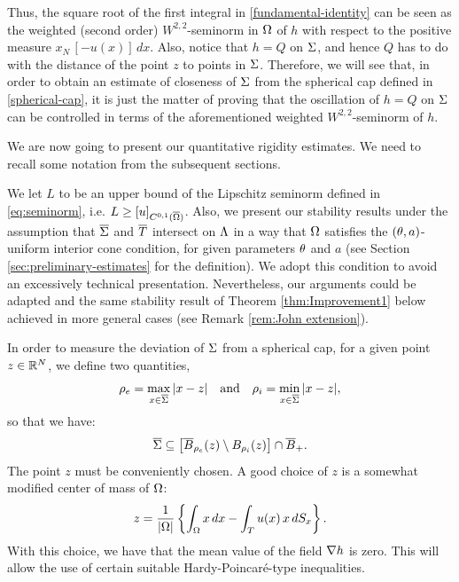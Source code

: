 \documentclass[a4paper,10pt]{amsart}
\numberwithin{equation}{section}
\begin{document}
Thus, the square root of the first integral in \eqref{fundamental-identity} can be seen as the weighted (second order) $W^{2,2}$-seminorm in $\Omega$ of $h$ with respect to the positive measure $x_N\,[-u(x)]\,dx$. Also, notice that $h=Q$ on $\Sigma$, and hence $Q$ has to do with the distance of the point $z$ to points in $\Sigma$. Therefore, we will see that, in order to obtain an estimate of closeness of $\Sigma$ from the spherical cap defined in \eqref{spherical-cap}, 
it is just the matter of proving that the oscillation of $h=Q$ on $\Sigma$ can be controlled in terms of the aforementioned weighted $W^{2,2}$-seminorm of $h$.
\par
We are now going to present our quantitative rigidity estimates. We need to recall some notation from the subsequent sections. 
\par
We let $L$ to be an upper bound of the Lipschitz seminorm defined in \eqref{eq:seminorm}, i.e. $L\ge [u]_{C^{0,1}(\overline{\Omega})}$. Also, 
we present our stability results under the assumption that $\overline{\Sigma}$ and $\overline{T}$ intersect on $\Lambda$ in a way that $\Omega$ satisfies the $(\theta,a)$-uniform interior cone condition, for given parameters $\theta$ and $a$ (see Section \ref{sec:preliminary-estimates} for the definition).
We adopt this condition to avoid an excessively technical presentation.
Nevertheless, our arguments could be adapted and the same stability result of Theorem \ref{thm:Improvement1} below achieved in
more general cases (see Remark \ref{rem:John extension}).
\par
In order to measure the deviation of $\Sigma$ from a spherical cap, for a given point $z \in \mathbb{R}^N$, we define two quantities,
\begin{equation*}
	\rho_e= \max_{x \in \overline{\Sigma} }{|x-z|} \quad\mbox{and}\quad \rho_i=\min_{x \in \overline{\Sigma} }{|x-z|},
\end{equation*}
so that we have:
$$
\overline{\Sigma} \subseteq \left[ \overline{B}_{\rho_e}(z) \setminus B_{\rho_i}(z) \right] \cap \overline{B}_+.
$$
The point $z$ must be conveniently chosen. A good choice of $z$ is a somewhat modified center of mass of $\Omega$:
\begin{equation}
\label{eq:choice z old school}
	z = \frac{1}{|\Omega|} \left\{ \int_\Omega x \, dx - \int_T u(x) \, x \, dS_x  \right\}.
\end{equation}
With this choice, we have that the mean value of the field $\nabla h$ is zero. 
This will allow the use of certain suitable Hardy-Poincar\'e-type inequalities.
\par
\end{document}
